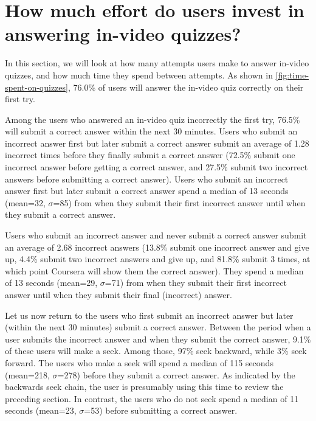 \documentclass{sigchi}
\begin{document}

\section{How much effort do users invest in answering in-video quizzes?}

In this section, we will look at how many attempts users make to answer in-video quizzes, and how much time they spend between attempts. As shown in \autoref{fig:time-spent-on-quizzes}, 76.0\% of users will answer the in-video quiz correctly on their first try.



Among the users who answered an in-video quiz incorrectly the first try, 76.5\% will submit a correct answer within the next 30 minutes. Users who submit an incorrect answer first but later submit a correct answer submit an average of 1.28 incorrect times before they finally submit a correct answer (72.5\% submit one incorrect answer before getting a correct answer, and 27.5\% submit two incorrect answers before submitting a correct answer). Users who submit an incorrect answer first but later submit a correct answer spend a median of 13 seconds (mean=32, $\sigma$=85) from when they submit their first incorrect answer until when they submit a correct answer.

Users who submit an incorrect answer and never submit a correct answer submit an average of 2.68 incorrect answers (13.8\% submit one incorrect answer and give up, 4.4\% submit two incorrect answers and give up, and 81.8\% submit 3 times, at which point Coursera will show them the correct answer). They spend a median of 13 seconds (mean=29, $\sigma$=71) from when they submit their first incorrect answer until when they submit their final (incorrect) answer.

Let us now return to the users who first submit an incorrect answer but later (within the next 30 minutes) submit a correct answer. Between the period when a user submits the incorrect answer and when they submit the correct answer, 9.1\% of these users will make a seek. Among those, 97\% seek backward, while 3\% seek forward. The users who make a seek will spend a median of 115 seconds (mean=218, $\sigma$=278) before they submit a correct answer. As indicated by the backwards seek chain, the user is presumably using this time to review the preceding section. In contrast, the users who do not seek spend a median of 11 seconds (mean=23, $\sigma$=53) before submitting a correct answer.
\end{document}
